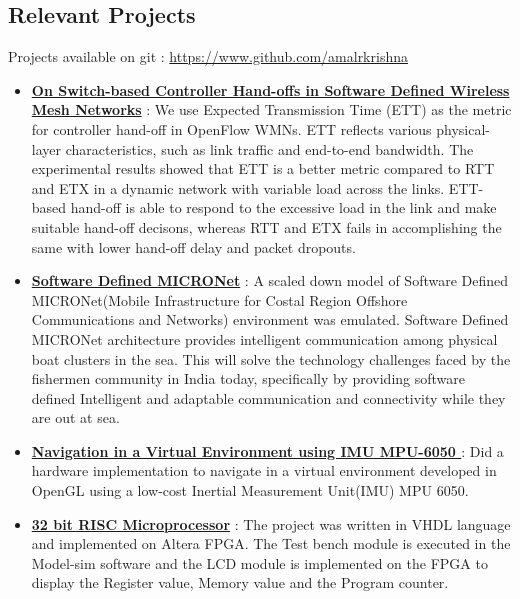\documentclass{resume}
\begin{document}
\begin{multicols}{2}
\section{Relevant Projects}
Projects available on git : \url{https://www.github.com/amalrkrishna}
\begin{itemize}
 \item \textbf{\href{}{On Switch-based Controller Hand-offs in Software Defined Wireless Mesh Networks}} : We use Expected Transmission Time (ETT) as the metric for controller hand-off in OpenFlow WMNs. ETT reflects various physical-layer characteristics, such as link traffic and end-to-end bandwidth. The experimental results showed that ETT is a better metric compared to RTT and ETX in a dynamic network with variable load across the links. ETT-based hand-off is able to respond to the excessive load in the link and make suitable hand-off decisons, whereas RTT and ETX fails in accomplishing the same with lower hand-off delay and packet dropouts.
 \item \textbf{\href{}{Software Defined MICRONet}} : A scaled down model of Software Defined MICRONet(Mobile Infrastructure for Costal Region Offshore Communications and Networks) environment was emulated. Software Defined MICRONet architecture provides intelligent communication among physical boat clusters in the sea. This will solve the technology challenges faced by the fishermen community in India today, specifically by providing software defined Intelligent and adaptable communication and connectivity while they are out at sea. 
 \item \textbf{\href{https://github.com/amalrkrishna/virtualnav-mpu6050}{
Navigation in a Virtual Environment using IMU MPU-6050
}} : Did a hardware implementation to navigate in a virtual environment developed in OpenGL using a low-cost Inertial Measurement Unit(IMU) MPU 6050.
 \item \textbf{\href{https://github.com/amalrkrishna/32bitrisc-vhdl}{32 bit RISC Microprocessor}} : The project was written in VHDL language and implemented on Altera FPGA. The Test bench module is executed in the Model-sim software and the LCD module is implemented on the FPGA to display the Register value, Memory value and the Program counter. 
\end{itemize}
\end{multicols}
\end{document}
